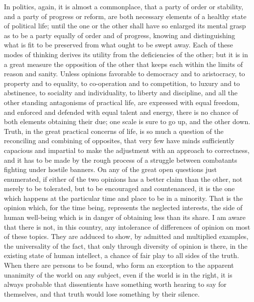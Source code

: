 \documentclass[12pt]{report}
\begin{document}
In politics, again, it is almost a commonplace, that a party of order or stability, and a party of progress or reform, are both necessary elements of a healthy state of political life; until the one or the other shall have so enlarged its mental grasp as to be a party equally of order and of progress, knowing and distinguishing what is fit to be preserved from what ought to be swept away. Each of these modes of thinking derives its utility from the deficiencies of the other; but it is in a great measure the opposition of the other that keeps each within the limits of reason and sanity. Unless opinions favorable to democracy and to aristocracy, to property and to equality, to co-operation and to competition, to luxury and to abstinence, to sociality and individuality, to liberty and discipline, and all the other standing antagonisms of practical life, are expressed with equal freedom, and enforced and defended with equal talent and energy, there is no chance of both elements obtaining their due; one scale is sure to go up, and the other down. Truth, in the great practical concerns of life, is so much a question of the reconciling and combining of opposites, that very few have minds sufficiently capacious and impartial to make the adjustment with an approach to correctness, and it has to be made by the rough process of a struggle between combatants fighting under hostile banners. On any of the great open questions just enumerated, if either of the two opinions has a better claim than the other, not merely to be tolerated, but to be encouraged and countenanced, it is the one which happens at the particular time and place to be in a minority. That is the opinion which, for the time being, represents the neglected interests, the side of human well-being which is in danger of obtaining less than its share. I am aware that there is not, in this country, any intolerance of differences of opinion on most of these topics. They are adduced to show, by admitted and multiplied examples, the universality of the fact, that only through diversity of opinion is there, in the existing state of human intellect, a chance of fair play to all sides of the truth. When there are persons to be found, who form an exception to the apparent unanimity of the world on any subject, even if the world is in the right, it is always probable that dissentients have something worth hearing to say for themselves, and that truth would lose something by their silence.
\end{document}
